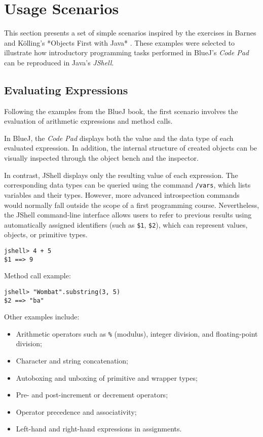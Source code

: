 \documentclass{article}
\begin{document}

\section{Usage Scenarios}

This section presents a set of simple scenarios inspired by the exercises in Barnes and Kölling’s *Objects First with Java* \cite{barnes2008objects}. These examples were selected to illustrate how introductory programming tasks performed in BlueJ’s \textit{Code Pad} can be reproduced in Java’s \textit{JShell}.

\subsection{Evaluating Expressions}

Following the examples from the BlueJ book, the first scenario involves the evaluation of arithmetic expressions and method calls.

In BlueJ, the \textit{Code Pad} displays both the value and the data type of each evaluated expression. In addition, the internal structure of created objects can be visually inspected through the object bench and the inspector.

In contrast, JShell displays only the resulting value of each expression. The corresponding data types can be queried using the command \texttt{/vars}, which lists variables and their types. However, more advanced introspection commands would normally fall outside the scope of a first programming course. Nevertheless, the JShell command-line interface allows users to refer to previous results using automatically assigned identifiers (such as \texttt{\$1}, \texttt{\$2}), which can represent values, objects, or primitive types.

\begin{lstlisting}
jshell> 4 + 5
$1 ==> 9
\end{lstlisting}

Method call example:

\begin{lstlisting}
jshell> "Wombat".substring(3, 5)
$2 ==> "ba"
\end{lstlisting}

Other examples include:
\begin{itemize}
  \item Arithmetic operators such as \texttt{\%} (modulus), integer division, and floating-point division;
  \item Character and string concatenation;
  \item Autoboxing and unboxing of primitive and wrapper types;
  \item Pre- and post-increment or decrement operators;
  \item Operator precedence and associativity;
  \item Left-hand and right-hand expressions in assignments.
\end{itemize}
\end{document}
